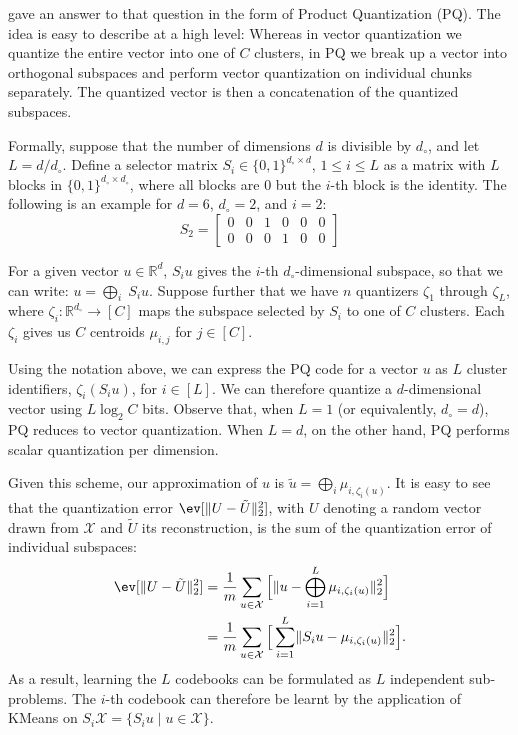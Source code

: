 \cite{pq} gave an answer to that question in the form of Product Quantization (PQ).
The idea is easy to describe at a high level:
Whereas in vector quantization we quantize the entire vector
into one of $C$ clusters, in PQ we break up a vector into orthogonal subspaces
and perform vector quantization on individual chunks separately.
The quantized vector is then a concatenation of the quantized subspaces.

Formally, suppose that the number of dimensions $d$ is divisible by $d_\circ$,
and let $L = d/d_\circ$. Define a selector matrix $S_i \in \{0, 1\}^{d_\circ \times d}$, $1 \leq i \leq L$
as a matrix with $L$ blocks in $\{0, 1\}^{d_\circ \times d_\circ}$, where all blocks are $0$
but the $i$-th block is the identity.
The following is an example for $d = 6$, $d_\circ = 2$, and $i = 2$:
\begin{equation*}
    S_2 = 
    \begin{bmatrix}
        0 & 0 & 1 & 0 & 0 & 0 \\
        0 & 0 & 0 & 1 & 0 & 0
    \end{bmatrix}
\end{equation*}

For a given vector $u \in \mathbb{R}^d$, $S_i u$ gives the $i$-th $d_\circ$-dimensional subspace,
so that we can write: $u = \bigoplus_i\; S_i u$.
Suppose further that we have $n$ quantizers $\zeta_1$ through $\zeta_L$,
where $\zeta_i: \mathbb{R}^{d_\circ} \rightarrow [C]$ maps the subspace selected
by $S_i$ to one of $C$ clusters. Each $\zeta_i$ gives us $C$ centroids $\mu_{i,j}$
for $j \in [C]$.

Using the notation above, we can express the PQ code for a vector $u$ as $L$
cluster identifiers, $\zeta_i(S_i u)$, for $i \in [L]$. We can therefore quantize
a $d$-dimensional vector using $L \log_2 C$ bits. Observe that, when $L = 1$ (or equivalently,
$d_\circ = d$), PQ reduces to vector quantization. When $L = d$, on the other hand,
PQ performs scalar quantization per dimension.

Given this scheme, our approximation of $u$ is $\tilde{u} = \bigoplus_i \mu_{i, \zeta_i(u)}$.
It is easy to see that the quantization error $\ev[\lVert U - \tilde{U} \rVert_2^2]$, with $U$
denoting a random vector drawn from $\mathcal{X}$ and $\tilde{U}$ its reconstruction, is
the sum of the quantization error of individual subspaces:
\begin{align*}
    \ev[\lVert U - \tilde{U} \rVert_2^2] &=
        \frac{1}{m} \sum_{u \in \mathcal{X}} \Big[ \lVert u - \bigoplus_{i=1}^{L} \mu_{i, \zeta_i(u)} \rVert_2^2 \Big] \\
        &= \frac{1}{m} \sum_{u \in \mathcal{X}} \Big[ \sum_{i=1}^{L} \lVert S_i u - \mu_{i, \zeta_i(u)} \rVert_2^2 \Big].
\end{align*}
As a result, learning the $L$ codebooks can be formulated as $L$ independent
sub-problems. The $i$-th codebook can therefore be learnt by
the application of KMeans on $S_i \mathcal{X} = \{ S_i u \;|\; u \in \mathcal{X} \}$.

